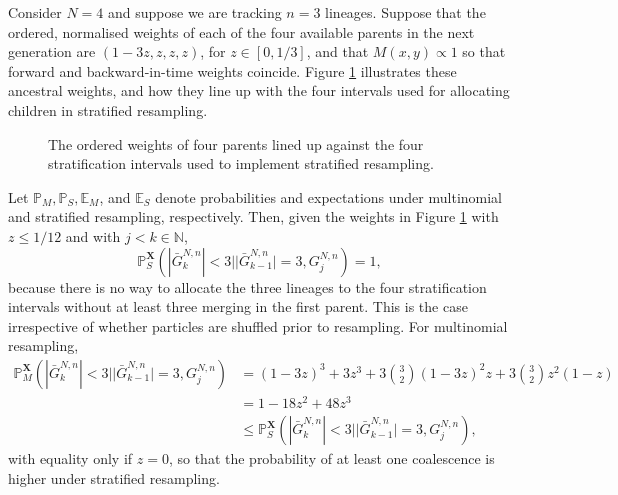 \documentclass[a4paper,11pt]{article}
\theoremstyle{definition}
\newcommand{\bbP}{\mathbb{P}}
\newcommand{\bbN}{\mathbb{N}}
\newcommand{\bbE}{\mathbb{E}}
\newcommand{\bfX}{\mathbf{X}}
\begin{document}
Consider $N = 4$ and suppose we are tracking $n = 3$ lineages.
Suppose that the ordered, normalised weights of each of the four available parents in the next generation are $(1 - 3z, z, z, z)$, for $z \in [0, 1/3]$, and that $M(x, y) \propto 1$ so that forward and backward-in-time weights coincide.
Figure \ref{fig:stratified} illustrates these ancestral weights, and how they line up with the four intervals used for allocating children in stratified resampling.
\begin{figure}[!ht]
\centering
\caption{The ordered weights of four parents lined up against the four stratification intervals used to implement stratified resampling.}
\label{fig:stratified}
\end{figure}

 Let $\bbP_M, \bbP_S, \bbE_M$, and $\bbE_S$ denote probabilities and expectations under multinomial and stratified resampling, respectively.
Then, given the weights in Figure \ref{fig:stratified} with $z \leq 1/12$ and with $j < k \in \bbN$,
\begin{equation*}
\bbP_S^{ \bfX }( | \bar{ G }_k^{ N, n } | < 3 | | \bar{ G }_{ k - 1 }^{ N, n } | = 3, G_j^{ N, n } ) = 1,
\end{equation*}
because there is no way to allocate the three lineages to the four stratification intervals without at least three merging in the first parent.
This is the case irrespective of whether particles are shuffled prior to resampling.
For multinomial resampling,
\begin{align*}
\bbP_M^{ \bfX }( | \bar{ G }_k^{ N, n } | < 3 | | \bar{ G }_{ k - 1 }^{ N, n } | = 3, G_j^{ N, n } ) &=  ( 1 - 3 z )^3 + 3 z^3 + 3 \binom{ 3 }{ 2 } ( 1 - 3 z )^2 z + 3 \binom{ 3 }{ 2 } z^2 ( 1 - z )\\
&= 1 - 18z^2 + 48z^3 \\
&\leq \bbP_S^{ \bfX }( | \bar{ G }_k^{ N, n } | < 3 | | \bar{ G }_{ k - 1 }^{ N, n } | = 3, G_j^{ N, n } ),
\end{align*}
with equality only if $z = 0$, so that the probability of at least one coalescence is higher under stratified resampling.
\end{document}
